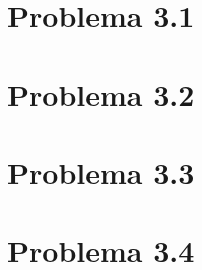 \section{Problema 3.1}  \label{problema3_1}

\newpage

\section{Problema 3.2}  \label{problema3_2}

\newpage

\section{Problema 3.3}  \label{problema3_3}

\newpage

\section{Problema 3.4}  \label{problema3_4}
